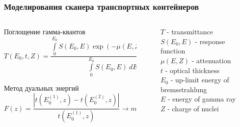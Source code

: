 \begin{frame}
\frametitle{Моделирования сканера транспортных контейнеров}
\begin{columns}
	\begin{column}{0.7\textwidth}
		\begin{block}{Поглощение гамма-квантов}
		$$
		T(E_0, t, Z) = \frac{\int \limits_0^{E_0} S(E_0, E) \exp(-\mu(E,Z)\times t)~dE)}{\int \limits_0^{E_0} S(E_0, E)~dE}
		$$
	\end{block}
    \begin{block}{Метод дуальных энергий}
    	$$
    	F(z) = \frac{|t(E^{(1)}_0,z) - t(E^{(2)}_0,z)|}{t(E^{(1)}_0,z)} \to min
    	$$
	
\end{block}
	\end{column}
	\vline~
	\begin{column}{0.4\textwidth} 
		$T$ -  transmittance\\
		$S(E_0, E)$ - response function\\
		$\mu(E,Z)$ - attenuation\\
		$t$ -  optical thickness\\
		$E_0$ -  up-limit energy of bremsstrahlung\\
		$E$ - energy of gamma ray\\
		$Z$ - charge of nuclei 
	\end{column}
\end{columns}  
\end{frame}

